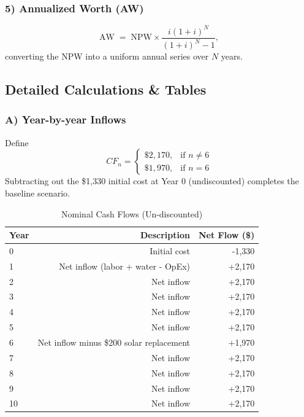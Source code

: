 \documentclass[12pt]{article}
\begin{document}
\subsubsection*{5) Annualized Worth (AW)}
\begin{equation}
    \text{AW} \;=\; \text{NPW} \times \frac{i(1+i)^N}{(1+i)^N - 1},
    \tag{Eq.~A5}
\end{equation}
\noindent converting the NPW into a uniform annual series over \(N\) years.

\newpage
\subsection*{Detailed Calculations \& Tables}

\subsubsection*{A) Year-by-year Inflows}
Define
\[
CF_n = 
\begin{cases}
    \$2,170, & \text{if }n \neq 6 \\
    \$1,970, & \text{if }n = 6
\end{cases}
\]
Subtracting out the \$1,330 initial cost at Year 0 (undiscounted) completes the baseline scenario.

\begin{table}[h]
\centering
\caption{Nominal Cash Flows (Un-discounted)}
\label{tab:nominalCF}
\begin{tabular}{@{}lrr@{}}
\toprule
\textbf{Year} & \textbf{Description} & \textbf{Net Flow (\$)} \\
\midrule
0 & Initial cost & -1,330 \\
1 & Net inflow (labor + water - OpEx) & +2,170 \\
2 & Net inflow & +2,170 \\
3 & Net inflow & +2,170 \\
4 & Net inflow & +2,170 \\
5 & Net inflow & +2,170 \\
6 & Net inflow minus \$200 solar replacement & +1,970 \\
7 & Net inflow & +2,170 \\
8 & Net inflow & +2,170 \\
9 & Net inflow & +2,170 \\
10 & Net inflow & +2,170 \\
\bottomrule
\end{tabular}
\end{table}
\end{document}
